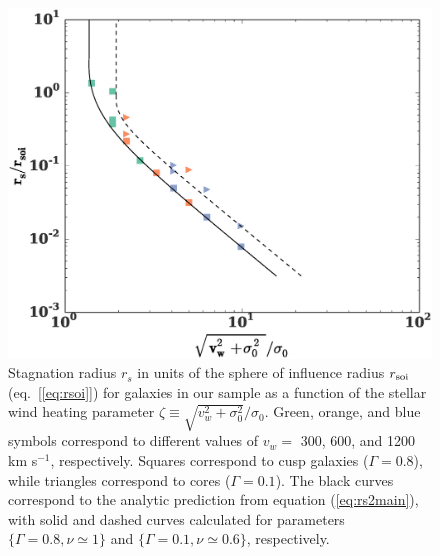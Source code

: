 \documentclass[usenatbib,fleqn]{mn2e}
\newcommand{\densSlope}{\nu}
\begin{document}
\begin{figure}
  \includegraphics[width=\columnwidth]{rs.eps}
  \caption{\label{fig:stag} Stagnation radius
    $r_{s}$ in units of the sphere of influence radius $r_{\rm soi}$
    (eq.~[\ref{eq:rsoi}]) for galaxies in our sample as a function of the stellar wind heating parameter $\zeta \equiv \sqrt{v_w^{2} + \sigma_0^{2}}/\sigma_0$.  Green, orange, and blue
    symbols correspond to different values of $v_{w} =$ 300, 600, and
    1200 km s$^{-1}$, respectively.  Squares correspond to cusp
    galaxies ($\Gamma = 0.8$), while triangles correspond to cores
    ($\Gamma = 0.1$). The black curves correspond to the analytic
    prediction from equation (\ref{eq:rs2main}), with solid and dashed
    curves calculated for parameters $\{\Gamma=0.8, \densSlope\simeq1\}$ and
    $\{\Gamma=0.1,\densSlope\simeq0.6\}$, respectively. }
\end{figure}
\end{document}
